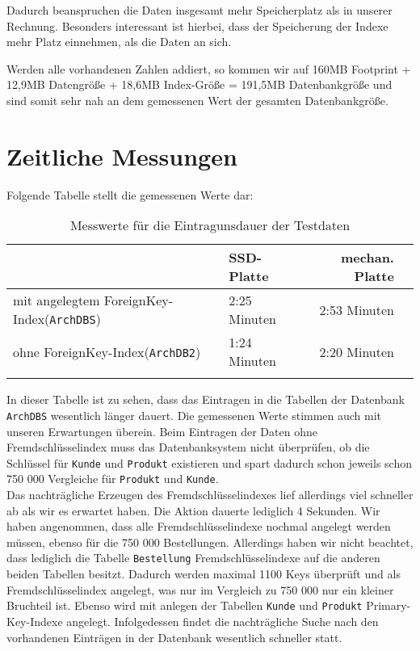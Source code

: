 Dadurch beanspruchen die Daten insgesamt mehr Speicherplatz als in unserer Rechnung. Besonders interessant ist hierbei, dass der Speicherung der Indexe mehr Platz einnehmen, als die Daten an sich.

Werden alle vorhandenen Zahlen addiert, so kommen wir auf 160MB Footprint + 12,9MB Datengröße + 18,6MB Index-Größe = 191,5MB Datenbankgröße und sind somit sehr nah an dem gemessenen Wert der gesamten Datenbankgröße.

\section{Zeitliche Messungen}
Folgende Tabelle stellt die gemessenen Werte dar:

\begin{longtable}{|l|l|r|r|} \hline
& SSD-Platte & mechan. Platte \\ \hline
mit angelegtem ForeignKey-Index(\texttt{ArchDBS}) & 2:25 Minuten & 2:53 Minuten \\ \hline
ohne ForeignKey-Index(\texttt{ArchDB2}) & 1:24 Minuten & 2:20 Minuten \\ \hline
\caption{Messwerte für die Eintragunsdauer der Testdaten}
\end{longtable}

In dieser Tabelle ist zu sehen, dass das Eintragen in die Tabellen der Datenbank \texttt{ArchDBS} wesentlich länger dauert. Die gemessenen Werte stimmen auch mit unseren Erwartungen überein. Beim Eintragen der Daten ohne Fremdschlüsselindex muss das Datenbanksystem nicht überprüfen, ob die Schlüssel für \texttt{Kunde} und \texttt{Produkt} existieren und spart dadurch schon jeweils schon 750 000 Vergleiche für \texttt{Produkt} und \texttt{Kunde}. \\

Das nachträgliche Erzeugen des Fremdschlüsselindexes lief allerdings viel schneller ab als wir es erwartet haben. Die Aktion dauerte lediglich 4 Sekunden. Wir haben angenommen, dass alle Fremdschlüsselindexe nochmal angelegt werden müssen, ebenso für die 750 000 Bestellungen. Allerdings haben wir nicht beachtet, dass lediglich die Tabelle \texttt{Bestellung} Fremdschlüsselindexe auf die anderen beiden Tabellen besitzt. Dadurch werden maximal 1100 Keys überprüft und als Fremdschlüsselindex angelegt, was nur im Vergleich zu 750 000 nur ein kleiner Bruchteil ist. Ebenso wird mit anlegen der Tabellen \texttt{Kunde} und \texttt{Produkt} Primary-Key-Indexe angelegt. Infolgedessen findet die nachträgliche Suche nach den vorhandenen Einträgen in der Datenbank wesentlich schneller statt.